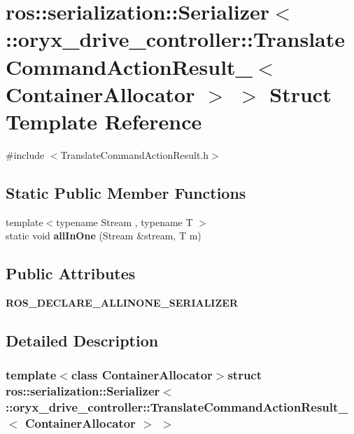 \section{ros\-:\-:serialization\-:\-:\-Serializer$<$ \-:\-:oryx\-\_\-drive\-\_\-controller\-:\-:\-Translate\-Command\-Action\-Result\-\_\-$<$ \-Container\-Allocator $>$ $>$ \-Struct \-Template \-Reference}
\label{structros_1_1serialization_1_1Serializer_3_01_1_1oryx__drive__controller_1_1TranslateCommandActi0c175bf803e967a16d16e1a237d0b706}


{\ttfamily \#include $<$\-Translate\-Command\-Action\-Result.\-h$>$}

\subsection*{\-Static \-Public \-Member \-Functions}
\begin{DoxyCompactItemize}
\item 
{\footnotesize template$<$typename Stream , typename T $>$ }\\static void {\bf all\-In\-One} (\-Stream \&stream, \-T m)
\end{DoxyCompactItemize}
\subsection*{\-Public \-Attributes}
\begin{DoxyCompactItemize}
\item 
{\bf \-R\-O\-S\-\_\-\-D\-E\-C\-L\-A\-R\-E\-\_\-\-A\-L\-L\-I\-N\-O\-N\-E\-\_\-\-S\-E\-R\-I\-A\-L\-I\-Z\-E\-R}
\end{DoxyCompactItemize}


\subsection{\-Detailed \-Description}
\subsubsection*{template$<$class Container\-Allocator$>$struct ros\-::serialization\-::\-Serializer$<$ \-::oryx\-\_\-drive\-\_\-controller\-::\-Translate\-Command\-Action\-Result\-\_\-$<$ Container\-Allocator $>$ $>$}



